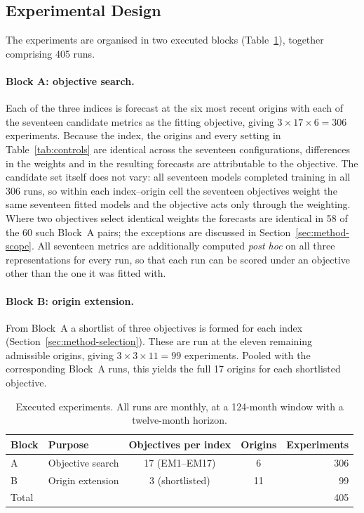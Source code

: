 \documentclass[12pt]{article}
\begin{document}
\subsection{Experimental Design}
\label{sec:method-design}

The experiments are organised in two executed blocks
(Table~\ref{tab:design}), together comprising 405 runs.

\paragraph{Block A: objective search.}
Each of the three indices is forecast at the six most recent origins with each
of the seventeen candidate metrics as the fitting objective, giving
$3 \times 17 \times 6 = 306$ experiments. Because the index, the origins and
every setting in Table~\ref{tab:controls} are identical across the seventeen
configurations, differences in the weights and in the resulting forecasts are
attributable to the objective. The candidate set itself does not vary: all
seventeen models completed training in all 306 runs, so within each
index--origin cell the seventeen objectives weight the same seventeen fitted
models and the objective acts only through the weighting. Where two objectives
select identical weights the forecasts are identical in 58 of the 60 such
Block~A pairs; the exceptions are discussed in
Section~\ref{sec:method-scope}. All seventeen metrics
are additionally computed \emph{post hoc} on all three representations for
every run, so that each run can be scored under an objective other than the one
it was fitted with.

\paragraph{Block B: origin extension.}
From Block~A a shortlist of three objectives is formed for each index
(Section~\ref{sec:method-selection}). These are run at the eleven remaining
admissible origins, giving $3 \times 3 \times 11 = 99$ experiments. Pooled with
the corresponding Block~A runs, this yields the full 17 origins for each
shortlisted objective.

\begin{table}[htbp]
\centering
\caption{Executed experiments. All runs are monthly, at a 124-month window
with a twelve-month horizon.}
\label{tab:design}
\begin{tabular}{llccr}
\toprule
Block & Purpose & Objectives per index & Origins & Experiments \\
\midrule
A & Objective search   & 17 (EM1--EM17) & 6  & 306 \\
B & Origin extension   & 3 (shortlisted) & 11 & 99 \\
\midrule
\multicolumn{4}{l}{Total} & 405 \\
\bottomrule
\end{tabular}
\end{table}
\end{document}
